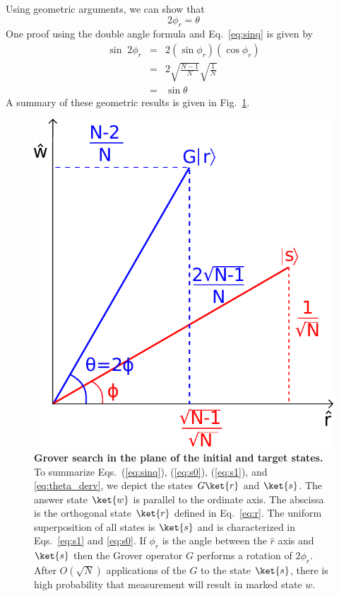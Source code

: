 \documentclass[11pt,oneside,final]{huthesis}%
\begin{document}
Using geometric arguments, we can show that 
\begin{equation}
	2\phi_r=\theta
	\label{eq:2fq}  
\end{equation}
One proof using the double angle formula and Eq.~\eqref{eq:sinq} is given by
\begin{eqnarray}
	\sin\;2\phi_r&=&  2(\sin\phi_r)(\cos\phi_r)\\
		   &=&  2\sqrt{\frac{N-1}{N}}\sqrt{\frac{1}{N}}\\
		   &=&  \sin \theta~\label{eq:theta_derv}
\end{eqnarray}
A summary of these geometric results is given in Fig.~\ref{fig:trig}.
\begin{figure}
	\begin{center}
		\includegraphics{./figures/trig}
	\end{center}
	\caption{\textbf{Grover search in the plane of the initial and target states.} To summarize Eqs.~(\ref{eq:sinq}), (\ref{eq:s0}), (\ref{eq:s1}), and \eqref{eq:theta_derv}, we depict the states $G\ket{r}$ and $\ket{s}$.   The answer state $\ket{w}$ is parallel to the ordinate axis.  The abscissa is the orthogonal state $\ket{r}$ defined in Eq.~\eqref{eq:r}.  The uniform superposition of all states is $\ket{s}$ and is characterized in Eqs.~\eqref{eq:s1} and \eqref{eq:s0}.  If $\phi_r$ is the angle between the $\hat{r}$ axis and $\ket{s}$ then the Grover operator $G$ performs a rotation of $2\phi_r$.  After $O(\sqrt{N})$ applications of the $G$ to the state $\ket{s}$, there is high probability that measurement will result in marked state $w$.  }
	\label{fig:trig}
\end{figure}
\end{document}
